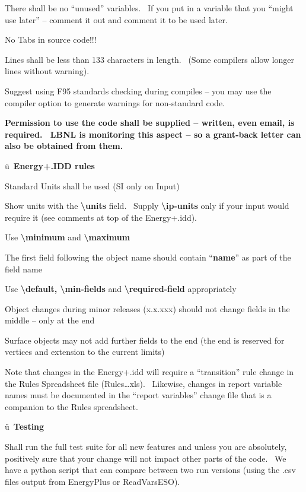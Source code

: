 There shall be no ``unused'' variables.~ If you put in a variable that you ``might use later'' -- comment it out and comment it to be used later.

No Tabs in source code!!!

Lines shall be less than 133 characters in length.~ (Some compilers allow longer lines without warning).

Suggest using F95 standards checking during compiles -- you may use the compiler option to generate warnings for non-standard code.

\textbf{Permission to use the code shall be supplied -- written, even email, is required.~ LBNL is monitoring this aspect -- so a grant-back letter can also be obtained from them.}

ü~\textbf{Energy+.IDD rules}

Standard Units shall be used (SI only on Input)

Show units with the \textbf{\textbackslash{}units} field.~ Supply \textbf{\textbackslash{}ip-units} only if your input would require it (see comments at top of the Energy+.idd).

Use \textbf{\textbackslash{}minimum} and \textbf{\textbackslash{}maximum}

The first field following the object name should contain ``\textbf{name}'' as part of the field name

Use \textbf{\textbackslash{}default, \textbackslash{}min-fields} and \textbf{\textbackslash{}required-field} appropriately

Object changes during minor releases (x.x.xxx) should not change fields in the middle -- only at the end

Surface objects may not add further fields to the end (the end is reserved for vertices and extension to the current limits)

Note that changes in the Energy+.idd will require a ``transition'' rule change in the Rules Spreadsheet file (Rules\ldots{}xls).~ Likewise, changes in report variable names must be documented in the ``report variables'' change file that is a companion to the Rules spreadsheet.

ü~\textbf{Testing}

Shall run the full test suite for all new features and unless you are absolutely, positively sure that your change will not impact other parts of the code.~ We have a python script that can compare between two run versions (using the .csv files output from EnergyPlus or ReadVarsESO).

